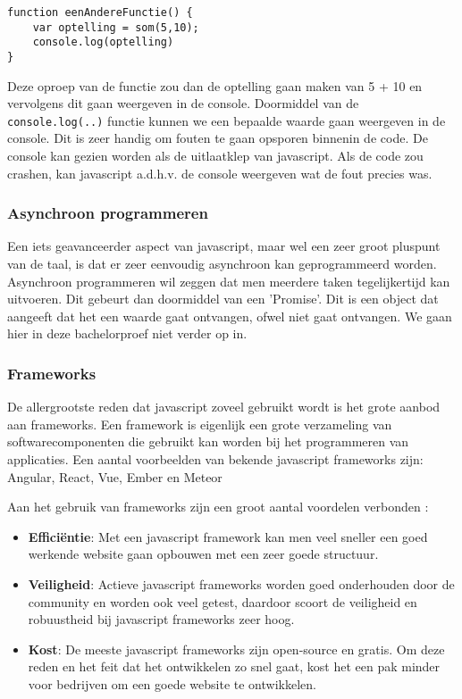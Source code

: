 \begin{lstlisting}[frame=single, caption=Een functie die de som functie oproept.]
function eenAndereFunctie() {
	var optelling = som(5,10);
	console.log(optelling)
}
\end{lstlisting}

Deze oproep van de functie zou dan de optelling gaan maken van 5 + 10 en vervolgens dit gaan weergeven in de console. Doormiddel van de \lstinline[basicstyle=\ttfamily\color{red}]|console.log(..)| functie kunnen we een bepaalde waarde gaan weergeven in de console. Dit is zeer handig om fouten te gaan opsporen binnenin de code. De console kan gezien worden als de uitlaatklep van javascript. Als de code zou crashen, kan javascript a.d.h.v. de console weergeven wat de fout precies was.

\subsubsection{Asynchroon programmeren}
\label{sssec:asynchroon-programmeren}
Een iets geavanceerder aspect van javascript, maar wel een zeer groot pluspunt van de taal, is dat er zeer eenvoudig asynchroon kan geprogrammeerd worden. Asynchroon programmeren wil zeggen dat men meerdere taken tegelijkertijd kan uitvoeren. Dit gebeurt dan doormiddel van een 'Promise'. Dit is een object dat aangeeft dat het een waarde gaat ontvangen, ofwel niet gaat ontvangen. We gaan hier in deze bachelorproef niet verder op in.

\subsubsection{Frameworks}
\label{sssec:frameworks}
De allergrootste reden dat javascript zoveel gebruikt wordt is het grote aanbod aan frameworks. Een framework is eigenlijk een grote verzameling van softwarecomponenten die gebruikt kan worden bij het programmeren van applicaties. Een aantal voorbeelden van bekende javascript frameworks zijn: Angular, React, Vue, Ember en Meteor

Aan het gebruik van frameworks zijn een groot aantal voordelen verbonden \autocite{Korotya2018}:

\begin{itemize}
	\item \textbf{Efficiëntie}: Met een javascript framework kan men veel sneller een goed werkende website gaan opbouwen met een zeer goede structuur.
	\item \textbf{Veiligheid}: Actieve javascript frameworks worden goed onderhouden door de community en worden ook veel getest, daardoor scoort de veiligheid en robuustheid bij javascript frameworks zeer hoog.
	\item \textbf{Kost}: De meeste javascript frameworks zijn open-source en gratis. Om deze reden en het feit dat het ontwikkelen zo snel gaat, kost het een pak minder voor bedrijven om een goede website te ontwikkelen.
\end{itemize}

